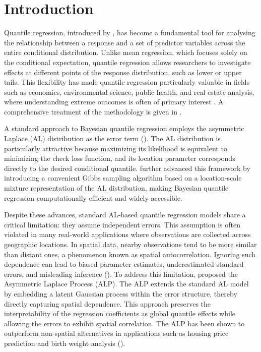 \documentclass[twoside]{article}
\numberwithin{equation}{section}
\begin{document}
	\section{Introduction}
	
	Quantile regression, introduced by \cite{KoenkerBassett1978}, has become
	a fundamental tool for analysing the relationship between a response
	and a set of predictor variables across the entire conditional distribution.
	Unlike mean regression, which focuses solely on the conditional expectation, quantile regression allows researchers to investigate effects at different points of the response distribution, such as lower or upper tails. This flexibility has made quantile regression particularly valuable in fields such as economics, environmental science, public health, and real estate analysis, where understanding extreme outcomes is often of primary interest \cite{KoenkerHallock2001,YuLuStander2003}. A comprehensive treatment of the methodology is given in \cite{Koenker2005}.
	
	A standard approach to Bayesian quantile regression employs the asymmetric Laplace (AL) distribution as the error term (\cite{YuMoyeed2001}). The AL distribution is particularly attractive because maximizing its likelihood is equivalent to minimizing the check loss function, and its location parameter corresponds directly to the desired conditional quantile. \cite{KozumiKobayashi2011} further advanced this framework by introducing a convenient Gibbs sampling algorithm based on a location-scale mixture representation of the AL distribution, making Bayesian quantile regression computationally efficient and widely accessible.
	
	Despite these advances, standard AL-based quantile regression models share a critical limitation: they assume independent errors. This assumption is often violated in many real-world applications where observations are collected across geographic locations. In spatial data, nearby observations tend to be more similar than distant ones, a phenomenon known as spatial autocorrelation. Ignoring such dependence can lead to biased parameter estimates, underestimated standard errors, and misleading inference (\cite{Banerjee2004}). To address this limitation, \cite{LumGelfand2012} proposed the Asymmetric Laplace Process (ALP). The ALP extends the standard AL model by embedding a latent Gaussian process within the error structure, thereby directly capturing spatial dependence. This approach preserves the interpretability of the regression coefficients as global quantile effects while allowing the errors to exhibit spatial correlation. The ALP has been shown to outperform non-spatial alternatives in applications such as housing price prediction and birth weight analysis (\cite{LumGelfand2012}).
	
\end{document}
